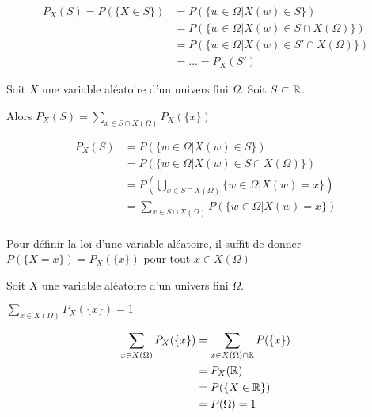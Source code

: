 \documentclass[a4paper, 12pt]{article}
\begin{document}
\begin{demonstration}
    \begin{align*}
        P_X(S) = P(\{X \in S\}) &= P(\{w \in \Omega | X(w) \in S\}) \\
        &= P(\{w \in \Omega | X(w) \in S \cap X(\Omega)\}) \\
        &= P(\{w \in \Omega | X(w) \in S' \cap X(\Omega)\}) \\
        &= \dots = P_X(S')
    \end{align*}
\end{demonstration}

\begin{proposition}
    Soit $X$ une variable aléatoire d'un univers fini $\Omega$.
    Soit $S \subset \mathbb{R}$.

    Alors $P_X(S) = \sum\limits_{x \in S \cap X(\Omega)} P_X(\{x\})$
\end{proposition}

\begin{demonstration}
    \begin{align*}
        P_X(S) &= P(\{w \in \Omega | X(w) \in S\}) \\
        &= P(\{w \in \Omega | X(w) \in S \cap X(\Omega)\}) \\
        &= P(\bigcup\limits_{x \in S \cap X(\Omega)} \{w \in \Omega | X(w) = x\}) \\
        &= \sum\limits_{x \in S \cap X(\Omega)} P(\{w \in \Omega | X(w) = x\}) \\
    \end{align*}
\end{demonstration}

\begin{remark}
    Pour définir la loi d'une variable aléatoire, il suffit de donner $P(\{X = x\}) = P_X(\{x\})$ pour tout $x \in X(\Omega)$
\end{remark}

\begin{proposition}
    Soit $X$ une variable aléatoire d'un univers fini $\Omega$.

    $\sum\limits_{x \in X(\Omega)} P_X(\{x\}) = 1$
\end{proposition}

\begin{demonstration}
    \begin{align*}
        \sum\limits_{x \in X(\Omega)} P_X(\{x\}) &= \sum\limits_{x \in X(\Omega) \cap \mathbb{R}} P(\{x\}) \\
        &= P_X(\mathbb{R}) \\
        &= P(\{X \in \mathbb{R}\}) \\
        &= P(\Omega) = 1
    \end{align*}
\end{demonstration}
\end{document}
